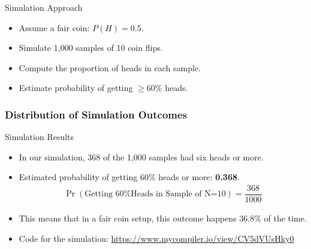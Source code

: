 \documentclass[]{beamer} %
\begin{document}
\begin{frame}{Simulation Approach}
    \begin{itemize}
        \item Assume a fair coin: $P(H) = 0.5$.
        \item Simulate 1,000 samples of 10 coin flips.
        \item Compute the proportion of heads in each sample.
        \item Estimate probability of getting $\geq 60\%$ heads.
    \end{itemize}
\end{frame}


\begin{frame}
    \frametitle{Distribution of Simulation Outcomes}

    \begin{figure}
        \centering
    \end{figure}

\end{frame}

\begin{frame}{Simulation Results}
    \begin{itemize}
    \item In our simulation, 368 of the 1,000 samples had six heads or more.
        \item Estimated probability of getting 60\% heads or more: \textbf{0.368}.
        \begin{align*}
            \Pr( \text{Getting 60\% Heads in Sample of N=10} ) = \dfrac{368}{1000}
        \end{align*}
        \item This means that in a fair coin setup, this outcome happens 36.8\% of the time.
        \item Code for the simulation:
        { \href{https://www.mycompiler.io/view/CV5dVUsHky0}{https://www.mycompiler.io/view/CV5dVUsHky0}
        }
    \end{itemize}
\end{frame}
\end{document}

